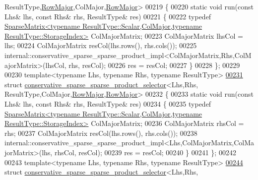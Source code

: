 \begin{DoxyCode}
      ResultType,\hyperlink{group__enums_ggaacded1a18ae58b0f554751f6cdf9eb13acfcde9cd8677c5f7caf6bd603666aae3}{RowMajor},ColMajor,\hyperlink{group__enums_ggaacded1a18ae58b0f554751f6cdf9eb13acfcde9cd8677c5f7caf6bd603666aae3}{RowMajor}>
00219 \{
00220   \textcolor{keyword}{static} \textcolor{keywordtype}{void} run(\textcolor{keyword}{const} Lhs& lhs, \textcolor{keyword}{const} Rhs& rhs, ResultType& res)
00221   \{
00222     \textcolor{keyword}{typedef} 
      \hyperlink{group___sparse_core___module_class_eigen_1_1_sparse_matrix}{SparseMatrix<typename ResultType::Scalar,ColMajor,typename ResultType::StorageIndex>}
       ColMajorMatrix;
00223     ColMajorMatrix lhsCol = lhs;
00224     ColMajorMatrix resCol(lhs.rows(), rhs.cols());
00225     internal::conservative\_sparse\_sparse\_product\_impl<ColMajorMatrix,Rhs,ColMajorMatrix>(lhsCol, rhs, 
      resCol);
00226     res = resCol;
00227   \}
00228 \};
00229 
00230 \textcolor{keyword}{template}<\textcolor{keyword}{typename} Lhs, \textcolor{keyword}{typename} Rhs, \textcolor{keyword}{typename} ResultType>
\hyperlink{struct_eigen_1_1internal_1_1conservative__sparse__sparse__product__selector_3_01_lhs_00_01_rhs_0f2b5b8a9c2dc31e0d24e7f7768286a83}{00231} \textcolor{keyword}{struct }\hyperlink{struct_eigen_1_1internal_1_1conservative__sparse__sparse__product__selector}{conservative\_sparse\_sparse\_product\_selector}<Lhs,Rhs,
      ResultType,ColMajor,\hyperlink{group__enums_ggaacded1a18ae58b0f554751f6cdf9eb13acfcde9cd8677c5f7caf6bd603666aae3}{RowMajor},\hyperlink{group__enums_ggaacded1a18ae58b0f554751f6cdf9eb13acfcde9cd8677c5f7caf6bd603666aae3}{RowMajor}>
00232 \{
00233   \textcolor{keyword}{static} \textcolor{keywordtype}{void} run(\textcolor{keyword}{const} Lhs& lhs, \textcolor{keyword}{const} Rhs& rhs, ResultType& res)
00234   \{
00235     \textcolor{keyword}{typedef} 
      \hyperlink{group___sparse_core___module_class_eigen_1_1_sparse_matrix}{SparseMatrix<typename ResultType::Scalar,ColMajor,typename ResultType::StorageIndex>}
       ColMajorMatrix;
00236     ColMajorMatrix rhsCol = rhs;
00237     ColMajorMatrix resCol(lhs.rows(), rhs.cols());
00238     internal::conservative\_sparse\_sparse\_product\_impl<Lhs,ColMajorMatrix,ColMajorMatrix>(lhs, rhsCol, 
      resCol);
00239     res = resCol;
00240   \}
00241 \};
00242 
00243 \textcolor{keyword}{template}<\textcolor{keyword}{typename} Lhs, \textcolor{keyword}{typename} Rhs, \textcolor{keyword}{typename} ResultType>
\hyperlink{struct_eigen_1_1internal_1_1conservative__sparse__sparse__product__selector_3_01_lhs_00_01_rhs_01e3769f60835369078028e205b540c14}{00244} \textcolor{keyword}{struct }\hyperlink{struct_eigen_1_1internal_1_1conservative__sparse__sparse__product__selector}{conservative\_sparse\_sparse\_product\_selector}<Lhs,Rhs,

\end{DoxyCode}
